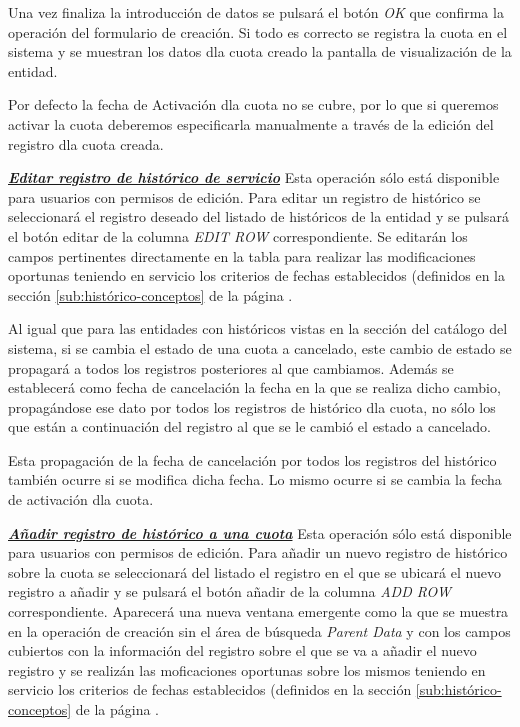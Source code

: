 Una vez finaliza la introducción de datos se pulsará el botón \emph{OK} que confirma la operación del formulario de creación. Si todo es correcto se registra la cuota en el sistema y se muestran los datos dla cuota creado la pantalla de visualización de la entidad.

Por defecto la fecha de Activación dla cuota no se cubre, por lo que si queremos activar la cuota deberemos especificarla manualmente a través de la edición del registro dla cuota creada.


\underline{\textsl{\textbf{Editar registro de histórico de servicio}}}\newline
Esta operación sólo está disponible para usuarios con permisos de edición.
Para editar un registro de histórico se seleccionará el registro deseado del listado de históricos de la entidad y se pulsará el botón editar de la columna \textit{EDIT ROW} correspondiente. Se editarán los campos pertinentes directamente en la tabla para realizar las modificaciones oportunas teniendo en servicio los criterios de fechas establecidos (definidos en la sección \ref{sub:histórico-conceptos} de la página \pageref{sub:histórico-conceptos}.

Al igual que para las entidades con históricos vistas en la sección del catálogo del sistema, si se cambia el estado de una cuota a cancelado, este cambio de estado se propagará a todos los registros posteriores al que cambiamos. Además se establecerá como fecha de cancelación la fecha en la que se realiza dicho cambio, propagándose ese dato por todos los registros de histórico dla cuota, no sólo los que están a continuación del registro al que se le cambió el estado a cancelado.

Esta propagación de la fecha de cancelación por todos los registros del histórico  también ocurre si se modifica dicha fecha. Lo mismo ocurre si se cambia la fecha de activación dla cuota.

\underline{\textsl{\textbf{Añadir registro de histórico a una cuota}}}\newline
Esta operación sólo está disponible para usuarios con permisos de edición.
Para añadir un nuevo registro de histórico sobre la cuota se seleccionará del listado el registro en el que se ubicará el nuevo registro a añadir y se pulsará el botón añadir de la columna \textit{ADD ROW} correspondiente. Aparecerá una nueva ventana emergente como la que se muestra en la operación de creación sin el área de búsqueda \emph{Parent Data} y con los campos cubiertos con la información del registro sobre el que se va a añadir el nuevo registro y se realizán las moficaciones oportunas sobre los mismos teniendo en servicio los criterios de fechas establecidos (definidos en la sección \ref{sub:histórico-conceptos} de la página \pageref{sub:histórico-conceptos}.


